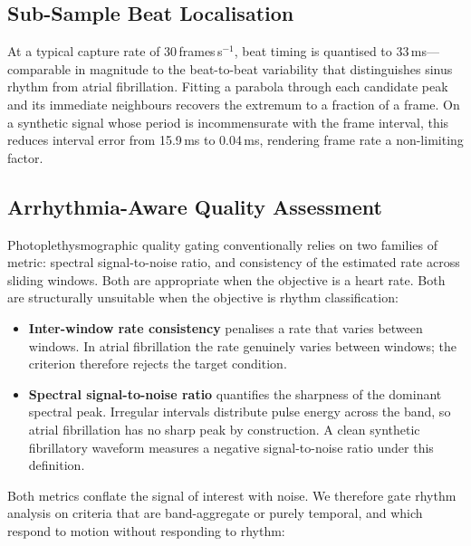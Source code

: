 \documentclass[conference]{IEEEtran}
\begin{document}
\subsection{Sub-Sample Beat Localisation}
\label{sec:subsample}
At a typical capture rate of 30\,frames\,s$^{-1}$, beat timing is quantised to
33\,ms---comparable in magnitude to the beat-to-beat variability that distinguishes
sinus rhythm from atrial fibrillation. Fitting a parabola through each candidate
peak and its immediate neighbours recovers the extremum to a fraction of a frame.
On a synthetic signal whose period is incommensurate with the frame interval, this
reduces interval error from 15.9\,ms to 0.04\,ms, rendering frame rate a
non-limiting factor.

\subsection{Arrhythmia-Aware Quality Assessment}
\label{sec:quality}
Photoplethysmographic quality gating conventionally relies on two families of
metric: spectral signal-to-noise ratio, and consistency of the estimated rate
across sliding windows. Both are appropriate when the objective is a heart rate.
Both are structurally unsuitable when the objective is rhythm classification:

\begin{itemize}
\item \textbf{Inter-window rate consistency} penalises a rate that varies between
      windows. In atrial fibrillation the rate genuinely varies between windows;
      the criterion therefore rejects the target condition.
\item \textbf{Spectral signal-to-noise ratio} quantifies the sharpness of the
      dominant spectral peak. Irregular intervals distribute pulse energy across
      the band, so atrial fibrillation has no sharp peak by construction. A clean
      synthetic fibrillatory waveform measures a negative signal-to-noise ratio
      under this definition.
\end{itemize}

Both metrics conflate the signal of interest with noise. We therefore gate rhythm
analysis on criteria that are band-aggregate or purely temporal, and which respond
to motion without responding to rhythm:
\end{document}
